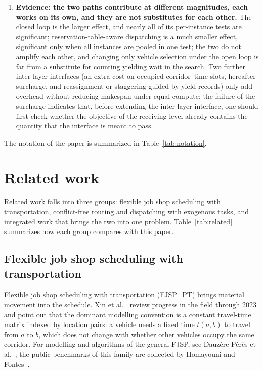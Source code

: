 \documentclass[manuscript,screen,review]{acmart}
\begin{document}
\begin{enumerate}[leftmargin=*]
\item \textbf{Evidence: the two paths contribute at different magnitudes, each works on its own, and they are not substitutes for each other.} The closed loop is the larger effect, and nearly all of its per-instance tests are significant; reservation-table-aware dispatching is a much smaller effect, significant only when all instances are pooled in one test; the two do not amplify each other, and changing only vehicle selection under the open loop is far from a substitute for counting yielding wait in the search.
Two further inter-layer interfaces (an extra cost on occupied corridor--time slots, hereafter surcharge, and reassignment or staggering guided by yield records) only add overhead without reducing makespan under equal compute; the failure of the surcharge indicates that, before extending the inter-layer interface, one should first check whether the objective of the receiving level already contains the quantity that the interface is meant to pass.


\end{enumerate}

The notation of the paper is summarized in Table~\ref{tab:notation}.



\section{Related work}
\label{sec:Chapter_II}

Related work falls into three groups: flexible job shop scheduling with transportation, conflict-free routing and dispatching with exogenous tasks, and integrated work that brings the two into one problem. Table~\ref{tab:related} summarizes how each group compares with this paper.

\subsection{Flexible job shop scheduling with transportation}

Flexible job shop scheduling with transportation (FJSP\_PT) brings material movement into the schedule. Xin et al.~\cite{xin2025review} review progress in the field through 2023 and point out that the dominant modelling convention is a constant travel-time matrix indexed by location pairs: a vehicle needs a fixed time $t(a,b)$ to travel from $a$ to $b$, which does not change with whether other vehicles occupy the same corridor. For modelling and algorithms of the general FJSP, see Dauz\`ere-P\'er\`es et al.~\cite{dauzereperes2024fjsp}; the public benchmarks of this family are collected by Homayouni and Fontes~\cite{homayouni2021production}.
\end{document}
